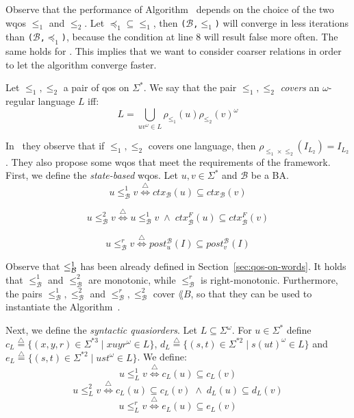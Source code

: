 Observe that the performance of Algorithm~ depends on
the choice of the two wqos $\leq_1$ and $\leq_2$.
Let $\mathord{\preceq_1} \subseteq \mathord{\leq_1}$, then
\texttt{($\mathcal{B}$,$\leq_1$)} will converge in less iterations
than \texttt{($\mathcal{B}$,$\preceq_1$)}, because the condition
at line $8$ will result false more often.
The same holds for .
This implies that we want to consider coarser relations in order to let the
algorithm converge faster.

\begin{definition}
\label{def:lang-cover}
Let $\leq_1, \leq_2$ a pair of qos on $\Sigma^*$.
We say that the pair $\leq_1,\leq_2$ \emph{covers} an $\omega$-regular language $L$ iff:
\[ L = \bigcup_{uv ^{\omega} \in L} \rho_{\leq_1}(u) \rho_{\leq_2}(v)^{\omega} \]
\end{definition}

In~\cite{ganty2020omegalang} they observe that if $\leq_1,\leq_2$ covers one language,
then $\rho_{\leq_1 \times \leq_2}(I_{L_2}) = I_{L_2}$.
They also propose some wqos that meet the requirements of the framework.
First, we define the \emph{state-based} wqos.
Let $u,v \in \Sigma^*$ and $\mathcal{B}$ be a BA.
\[ u \leq_{\mathcal{B}}^1 v \overset{\triangle}{\Longleftrightarrow}
ctx_{\mathcal{B}}(u) \subseteq ctx_{\mathcal{B}}(v)\]

\[ u \leq_{\mathcal{B}}^2 v \overset{\triangle}{\Longleftrightarrow}
u \leq^1_{\mathcal{B}} v \; \wedge \;
ctx_{\mathcal{B}}^F(u) \subseteq ctx_{\mathcal{B}}^F(v)\]

\[ u \leq_{\mathcal{B}}^r v \overset{\triangle}{\Longleftrightarrow}
post^{\mathcal{B}}_u(I) \subseteq post^{\mathcal{B}}_v(I)\]

Observe that $\leq^1_{\mathcal{B}}$ has been already defined in Section~\ref{sec:qos-on-words}.
It holds that $\leq_{\mathcal{B}}^1$ and $\leq_{\mathcal{B}}^2$ are monotonic, while
$\leq_{\mathcal{B}}^r$ is right-monotonic.
Furthermore, the pairs $\leq_{\mathcal{B}}^1, \leq_{\mathcal{B}}^2$ and
$\leq_{\mathcal{B}}^r, \leq_{\mathcal{B}}^2$ cover $\lang{B}$, so that they can
be used to instantiate the Algorithm~.

Next, we define the \emph{syntactic quasiorders}.
Let $L \subseteq \Sigma^{\omega}$.
For $u \in \Sigma^*$ define
$c_L \overset{\triangle}{=} \{(x,y,r) \in \Sigma^{*3} \;|\; xuyr^{\omega} \in L\}$,
$d_L \overset{\triangle}{=} \{(s,t) \in \Sigma^{*2} \;|\; s(ut) ^{\omega} \in L\}$ and
$e_L \overset{\triangle}{=} \{ (s,t) \in \Sigma^{*2} \;|\; ust ^{\omega} \in L\}$.
We define:
\[ u \leq^1_L v \overset{\triangle}{\Longleftrightarrow} c_L(u) \subseteq c_L(v) \]
\[ u \leq^2_L v \overset{\triangle}{\Longleftrightarrow} c_L(u) \subseteq c_L(v)
\; \wedge \; d_L(u) \subseteq d_L(v)\]
\[ u \leq^r_L v \overset{\triangle}{\Longleftrightarrow} e_L(u) \subseteq e_L(v) \]

